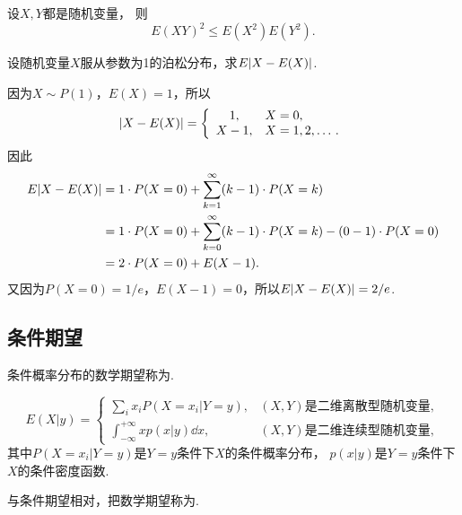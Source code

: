 \begin{property}
设\(X,Y\)都是随机变量，
则\begin{equation}
	E(XY)^2 \leq E(X^2) E(Y^2).
\end{equation}
\end{property}

\begin{example}
设随机变量\(X\)服从参数为1的泊松分布，求\(E\abs{X-E(X)}\).
\begin{solution}
因为\(X \sim P(1)\)，\(E(X) = 1\)，所以\[
	\abs{X-E(X)} = \left\{ \begin{array}{cl}
		1, & X=0, \\
		X - 1, & X=1,2,\dotsc.
	\end{array} \right.
\]
因此\begin{align*}
	E\abs{X-E(X)}
	&= 1 \cdot P(X=0)
	+ \sum_{k=1}^\infty (k-1) \cdot P(X=k) \\
	&= 1 \cdot P(X=0)
	+ \sum_{k=0}^\infty (k-1) \cdot P(X=k)
	- (0-1) \cdot P(X=0) \\
	&= 2 \cdot P(X=0)
	+ E(X-1).
\end{align*}
又因为\(P(X=0)=1/e\)，\(E(X-1) = 0\)，所以\(E\abs{X-E(X)} = 2/e\).
\end{solution}
\end{example}

\subsection{条件期望}
\begin{definition}
条件概率分布的数学期望称为.
\end{definition}
\begin{equation}
	E(X \vert y)
	= \left\{ \begin{array}{cl}
		\sum_i x_i P(X=x_i \vert Y = y),
		& \text{$(X,Y)$是二维离散型随机变量}, \\
		\int_{-\infty}^{+\infty} x p(x \vert y) \dd{x},
		& \text{$(X,Y)$是二维连续型随机变量},
	\end{array} \right.
\end{equation}
其中\(P(X=x_i \vert Y=y)\)是\(Y=y\)条件下\(X\)的条件概率分布，
\(p(x \vert y)\)是\(Y=y\)条件下\(X\)的条件密度函数.

与条件期望相对，把数学期望称为.

